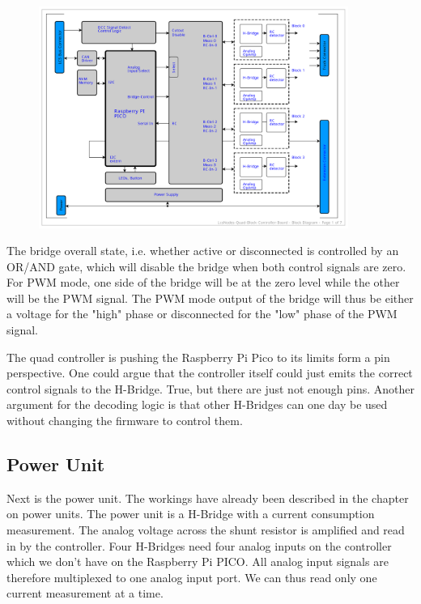 \begin{figure}[htbp]
    \centering
    \includegraphics[page=3, width=0.9\textwidth]{./Schematics/Schematic_LcsNodes-Quad-Block-Controller.pdf}
\end{figure}
\FloatBarrier

The bridge overall state, i.e. whether active or disconnected is controlled by an OR/AND gate, which will disable the bridge when both control signals are zero. For PWM mode, one side of the bridge will be at the zero level while the other will be the PWM signal. The PWM mode output of the bridge will thus be either a voltage for the "high" phase or disconnected for the "low" phase of the PWM signal.

The quad controller is pushing the Raspberry Pi Pico to its limits form a pin perspective. One could argue that the controller itself could just emits the correct control signals to the H-Bridge. True, but there are just not enough pins. Another argument for the decoding logic is that other H-Bridges can one day be used without changing the firmware to control them. 

\subsection{Power Unit}

Next is the power unit. The workings have already been described in the chapter on power units. The power unit is a H-Bridge with a current consumption measurement. The analog voltage across the shunt resistor is amplified and read in by the controller. Four H-Bridges need four analog inputs on the controller which we don't have on the Raspberry Pi PICO. All analog input signals are therefore multiplexed to one analog input port. We can thus read only one current measurement at a time.

